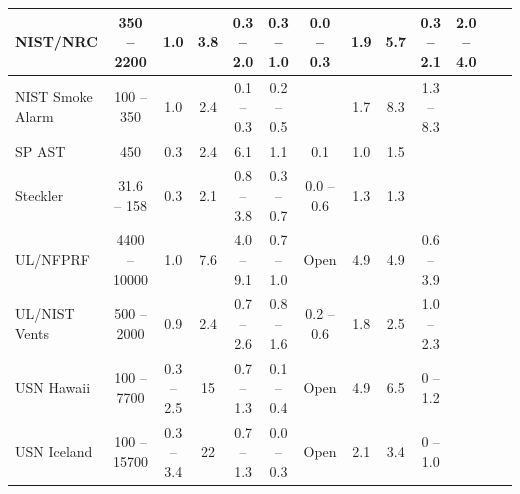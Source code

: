 \begin{table}
\begin{center}
\begin{tabular}{|l|c|c|c|c|c|c|c|c|c|c|c|c|}
NIST/NRC                         & 350 -- 2200   & 1.0              & 3.8      & 0.3 -- 2.0              & 0.3 -- 1.0                 & 0.0 -- 0.3      & 1.9                & 5.7              & 0.3 -- 2.1                  & 2.0 -- 4.0                          \\ \hline
NIST Smoke Alarm            & 100 -- 350     & 1.0             & 2.4       & 0.1 -- 0.3               & 0.2 -- 0.5                 &                      & 1.7                & 8.3              & 1.3 -- 8.3                  &                                          \\ \hline
SP AST                             & 450                & 0.3              & 2.4      & 6.1                         & 1.1                           & 0.1              & 1.0                  & 1.5               &                                  &                                         \\ \hline
Steckler                            & 31.6 -- 158    & 0.3              & 2.1      & 0.8 -- 3.8              & 0.3 -- 0.7                  & 0.0 -- 0.6    & 1.3                 & 1.3                &                                  &                                         \\ \hline
UL/NFPRF                        & 4400 -- 10000 & 1.0             & 7.6      & 4.0 -- 9.1              & 0.7 -- 1.0                  & Open           & 4.9                 & 4.9                & 0.6 -- 3.9                 &                                         \\ \hline
UL/NIST Vents                 & 500 -- 2000     & 0.9              & 2.4     & 0.7 -- 2.6             & 0.8 -- 1.6                  & 0.2 -- 0.6    & 1.8                 & 2.5                & 1.0 -- 2.3                  &                                       \\ \hline
USN Hawaii                     & 100 -- 7700      & 0.3 -- 2.5    & 15      & 0.7 -- 1.3              & 0.1 -- 0.4                  & Open          & 4.9                  & 6.5                & 0 -- 1.2                    &                                          \\ \hline
USN Iceland                    & 100 -- 15700   & 0.3 -- 3.4    & 22      & 0.7 -- 1.3             & 0.0 -- 0.3                  & Open           & 2.1                 & 3.4                & 0 -- 1.0                     &                                       \\ \hline

\end{tabular}
\end{center}
\end{table}
